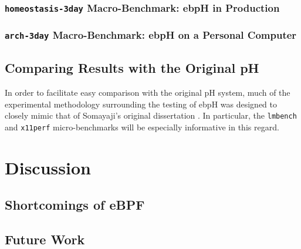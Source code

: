 \documentclass[
  12pt]{findlay}
\newcommand{\passthrough}[1]{#1}
\begin{document}
\FloatBarrier

\hypertarget{homeostasis-3day-macro-benchmark-ebph-in-production}{%
\subsubsection{\texorpdfstring{\texttt{homeostasis-3day}
Macro-Benchmark: ebpH in
Production}{homeostasis-3day Macro-Benchmark: ebpH in Production}}\label{homeostasis-3day-macro-benchmark-ebph-in-production}}

\hypertarget{arch-3day-macro-benchmark-ebph-on-a-personal-computer}{%
\subsubsection{\texorpdfstring{\texttt{arch-3day} Macro-Benchmark: ebpH
on a Personal
Computer}{arch-3day Macro-Benchmark: ebpH on a Personal Computer}}\label{arch-3day-macro-benchmark-ebph-on-a-personal-computer}}

\hypertarget{comparing-results-with-the-original-ph}{%
\subsection{Comparing Results with the Original
pH}\label{comparing-results-with-the-original-ph}}

In order to facilitate easy comparison with the original pH system, much
of the experimental methodology surrounding the testing of ebpH was
designed to closely mimic that of Somayaji's original dissertation
\autocite{soma02}. In particular, the \passthrough{\lstinline!lmbench!}
and \passthrough{\lstinline!x11perf!} micro-benchmarks will be
especially informative in this regard.

\hypertarget{discussion}{%
\section{Discussion}\label{discussion}}

\hypertarget{shortcomings-of-ebpf}{%
\subsection{Shortcomings of eBPF}\label{shortcomings-of-ebpf}}

\hypertarget{future-work}{%
\subsection{Future Work}\label{future-work}}
\end{document}
